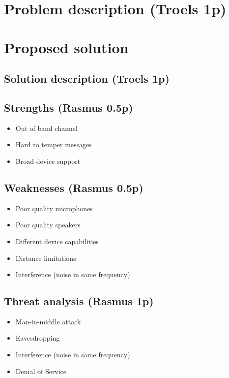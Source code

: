 \documentclass[12pt]{article}
\begin{document}
\newpage

\section{Problem description (Troels 1p)}
\label{sec:Problem}

\newpage

\section{Proposed solution}
\label{sec:Proposed solution}

\subsection{Solution description (Troels 1p)}
\label{sub:Solution description}

\subsection{Strengths (Rasmus 0.5p)}
\label{sub:Strengths}

\begin{itemize}
    \item Out of band channel
    \item Hard to temper messages
    \item Broad device support
\end{itemize}

\subsection{Weaknesses (Rasmus 0.5p)}
\label{sub:Weaknesses}

\begin{itemize}
    \item Poor quality microphones
    \item Poor quality speakers
    \item Different device capabilities
    \item Distance limitations
    \item Interference (noise in same frequency)
\end{itemize}

\subsection{Threat analysis (Rasmus 1p)}
\label{sub:Threat analysis}

\begin{itemize}
    \item Man-in-middle attack
    \item Eavesdropping
    \item Interference (noise in same frequency)
    \item Denial of Service
\end{itemize}
\end{document}
